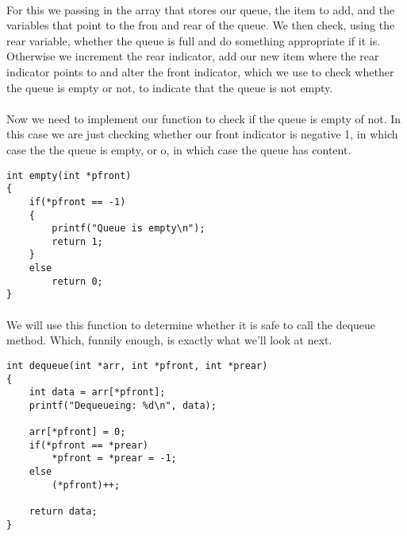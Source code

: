 \documentclass[10pt, a4paper, twosize]{article}
\begin{document}
\paragraph{} For this we passing in the array that stores our queue, the item to add, and the variables that point to the fron and rear of the queue. We then check, using the rear variable, whether the queue is full and do something appropriate if it is. Otherwise we increment the rear indicator, add our new item where the rear indicator points to and alter the front indicator, which we use to check whether the queue is empty or not, to indicate that the queue is not empty.

\paragraph{} Now we need to implement our function to check if the queue is empty of not. In this case we are just checking whether our front indicator is negative 1, in which case the the queue is empty, or o, in which case the queue has content. 

\begin{lstlisting}
int empty(int *pfront)
{
    if(*pfront == -1)
    {
        printf("Queue is empty\n");
        return 1;
    }
    else
        return 0;
}
\end{lstlisting}


\paragraph{} We will use this function to determine whether it is safe to call the dequeue method. Which, funnily enough, is exactly what we'll look at next.

\begin{lstlisting}
int dequeue(int *arr, int *pfront, int *prear)
{
    int data = arr[*pfront];
    printf("Dequeueing: %d\n", data);
    
    arr[*pfront] = 0;
    if(*pfront == *prear)
        *pfront = *prear = -1;
    else
        (*pfront)++;
        
    return data;
}
\end{lstlisting}
\end{document}
